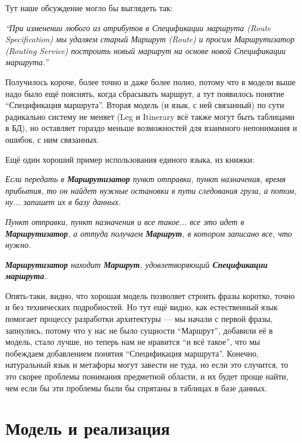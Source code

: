 \documentclass[a5paper]{article}
\begin{document}
Тут наше обсуждение могло бы выглядеть так:

\textit{``При изменении любого из атрибутов в Спецификации маршрута (Route Specification) мы удаляем старый Маршрут (Route) и просим Маршрутизатор (Routing Service) построить новый маршрут на основе новой Спецификации маршрута.''}

Получилось короче, более точно и даже более полно, потому что в модели выше надо было ещё пояснять, когда сбрасывать маршрут, а тут появилось понятие ``Спецификация маршрута''. Вторая модель (и язык, с ней связанный) по сути радикально систему не меняет (Leg и Itinerary всё также могут быть таблицами в БД), но оставляет гораздо меньше возможностей для взаимного непонимания и ошибок, с ним связанных.

Ещё один хороший пример использования единого языка, из книжки:

\begin{center}
    \textit{Если передать в \textbf{Маршрутизатор} пункт отправки, пункт назначения, время прибытия, то он найдет нужные остановки в пути следования груза, а потом, ну... запишет их в базу данных.}

    \vspace{4mm}

    \textit{Пункт отправки, пункт назначения и все такое... все это идет в \textbf{Маршрутизатор}, а оттуда получаем \textbf{Маршрут}, в котором записано все, что нужно.}

    \vspace{4mm}

    \textit{\textbf{Маршрутизатор} находит \textbf{Маршрут}, удовлетворяющий \textbf{Спецификации маршрута}.}
\end{center}

Опять-таки, видно, что хорошая модель позволяет строить фразы коротко, точно и без технических подробностей. Но тут ещё видно, как естественный язык помогает процессу разработки архитектуры --- мы начали с первой фразы, запнулись, потому что у нас не было сущности ``Маршрут'', добавили её в модель, стало лучше, но теперь нам не нравится ``и всё такое'', что мы побеждаем добавлением понятия ``Спецификация маршрута''. Конечно, натуральный язык и метафоры могут завести не туда, но если это случится, то это скорее проблемы понимания предметной области, и их будет проще найти, чем если бы эти проблемы были бы спрятаны в таблицах в базе данных.

\section{Модель и реализация}
\end{document}

